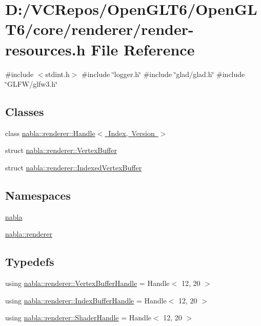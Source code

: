 \hypertarget{render-resources_8h}{}\section{D\+:/\+V\+C\+Repos/\+Open\+G\+L\+T6/\+Open\+G\+L\+T6/core/renderer/render-\/resources.h File Reference}
\label{render-resources_8h}
{\ttfamily \#include $<$stdint.\+h$>$}\newline
{\ttfamily \#include \char`\"{}logger.\+h\char`\"{}}\newline
{\ttfamily \#include \char`\"{}glad/glad.\+h\char`\"{}}\newline
{\ttfamily \#include \char`\"{}G\+L\+F\+W/glfw3.\+h\char`\"{}}\newline
\subsection*{Classes}
\begin{DoxyCompactItemize}
\item 
class \mbox{\hyperlink{classnabla_1_1renderer_1_1_handle}{nabla\+::renderer\+::\+Handle$<$ Index, Version $>$}}
\item 
struct \mbox{\hyperlink{structnabla_1_1renderer_1_1_vertex_buffer}{nabla\+::renderer\+::\+Vertex\+Buffer}}
\item 
struct \mbox{\hyperlink{structnabla_1_1renderer_1_1_indexed_vertex_buffer}{nabla\+::renderer\+::\+Indexed\+Vertex\+Buffer}}
\end{DoxyCompactItemize}
\subsection*{Namespaces}
\begin{DoxyCompactItemize}
\item 
 \mbox{\hyperlink{namespacenabla}{nabla}}
\item 
 \mbox{\hyperlink{namespacenabla_1_1renderer}{nabla\+::renderer}}
\end{DoxyCompactItemize}
\subsection*{Typedefs}
\begin{DoxyCompactItemize}
\item 
using \mbox{\hyperlink{namespacenabla_1_1renderer_aa901f31283abb372f2a5ca3b90e09f54}{nabla\+::renderer\+::\+Vertex\+Buffer\+Handle}} = Handle$<$ 12, 20 $>$
\item 
using \mbox{\hyperlink{namespacenabla_1_1renderer_a6c2d393ca75aa2575fca09b5ef8bda55}{nabla\+::renderer\+::\+Index\+Buffer\+Handle}} = Handle$<$ 12, 20 $>$
\item 
using \mbox{\hyperlink{namespacenabla_1_1renderer_a351c881c3df21186064938743d67dd85}{nabla\+::renderer\+::\+Shader\+Handle}} = Handle$<$ 12, 20 $>$
\end{DoxyCompactItemize}
